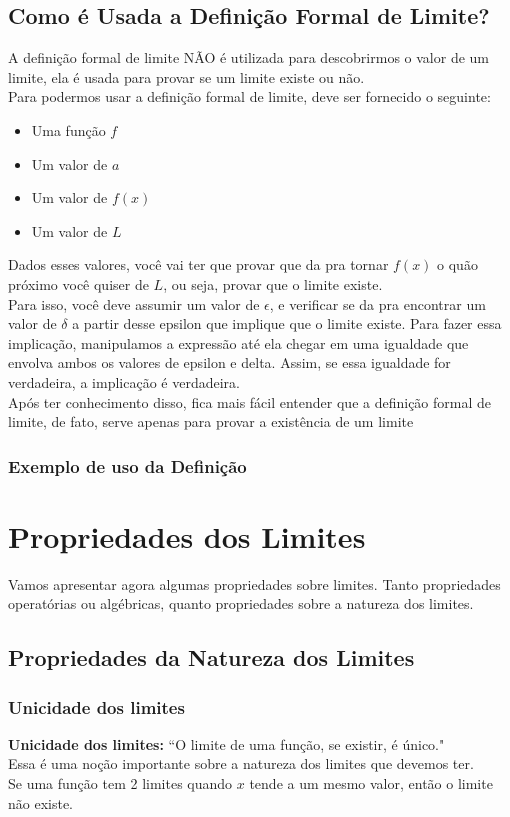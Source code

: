 \documentclass{article}
\begin{document}
\subsection{Como é Usada a Definição Formal de Limite?}
A definição formal de limite NÃO é utilizada para descobrirmos o valor de um limite, ela é usada para provar se um limite existe ou não.
\\[2pt]
Para podermos usar a definição formal de limite, deve ser fornecido o seguinte:
\begin{itemize}
    \item Uma função $f$
    \item Um valor de $a$
    \item Um valor de $f(x)$
    \item Um valor de $L$
\end{itemize}
Dados esses valores, você vai ter que provar que da pra tornar $f(x)$ o quão próximo você quiser de $L$, ou seja, provar que o limite existe.
\\[2pt]
Para isso, você deve assumir um valor de $\epsilon$, e verificar se da pra encontrar um valor de $\delta$ a partir desse epsilon que implique que o limite existe. Para fazer essa implicação, manipulamos a expressão até ela chegar em uma igualdade que envolva ambos os valores de epsilon e delta. Assim, se essa igualdade for verdadeira, a implicação é verdadeira. 
\\[2pt]
Após ter conhecimento disso, fica mais fácil entender que a definição formal de limite, de fato, serve apenas para provar a existência de um limite

\subsubsection{Exemplo de uso da Definição}

\section{Propriedades dos Limites}
Vamos apresentar agora algumas propriedades sobre limites. Tanto propriedades operatórias ou algébricas, quanto propriedades sobre a natureza dos limites.

\subsection{Propriedades da Natureza dos Limites}

\subsubsection{Unicidade dos limites}
\textbf{Unicidade dos limites:} ``O limite de uma função, se existir, é único."
\\[2pt]
Essa é uma noção importante sobre a natureza dos limites que devemos ter.
\\[2pt]
Se uma função tem 2 limites quando $x$ tende a um mesmo valor, então o limite não existe.
\end{document}
